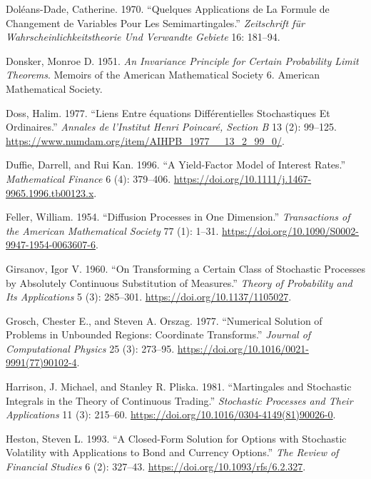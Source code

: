 \documentclass[
  english,
  10pt,
  letterpaper,
  DIV=11,
  numbers=noendperiod]{scrartcl}
\newlength{\cslhangindent}
\newenvironment{CSLReferences}[2] %
 {\begin{list}{}{%
  \setlength{\itemindent}{0pt}
  \setlength{\leftmargin}{0pt}
  \setlength{\parsep}{0pt}
  \ifodd #1
   \setlength{\leftmargin}{\cslhangindent}
   \setlength{\itemindent}{-1\cslhangindent}
  \fi
  \setlength{\itemsep}{#2\baselineskip}}}
 {\end{list}}
\theoremstyle{definition}
\theoremstyle{plain}
\theoremstyle{plain}
\theoremstyle{remark}
\begin{document}
\begin{CSLReferences}{1}{1}
Doléans-Dade, Catherine. 1970. {``Quelques Applications de La Formule de
Changement de Variables Pour Les Semimartingales.''} \emph{Zeitschrift
f{ü}r Wahrscheinlichkeitstheorie Und Verwandte Gebiete} 16: 181--94.

Donsker, Monroe D. 1951. \emph{An Invariance Principle for Certain
Probability Limit Theorems}. Memoirs of the American Mathematical
Society 6. American Mathematical Society.

Doss, Halim. 1977. {``Liens Entre {é}quations Diff{é}rentielles
Stochastiques Et Ordinaires.''} \emph{Annales de l'Institut Henri
Poincar{é}, Section B} 13 (2): 99--125.
\url{https://www.numdam.org/item/AIHPB_1977__13_2_99_0/}.

Duffie, Darrell, and Rui Kan. 1996. {``A Yield-Factor Model of Interest
Rates.''} \emph{Mathematical Finance} 6 (4): 379--406.
\url{https://doi.org/10.1111/j.1467-9965.1996.tb00123.x}.

Feller, William. 1954. {``Diffusion Processes in One Dimension.''}
\emph{Transactions of the American Mathematical Society} 77 (1): 1--31.
\url{https://doi.org/10.1090/S0002-9947-1954-0063607-6}.

Girsanov, Igor V. 1960. {``On Transforming a Certain Class of Stochastic
Processes by Absolutely Continuous Substitution of Measures.''}
\emph{Theory of Probability and Its Applications} 5 (3): 285--301.
\url{https://doi.org/10.1137/1105027}.

Grosch, Chester E., and Steven A. Orszag. 1977. {``Numerical Solution of
Problems in Unbounded Regions: Coordinate Transforms.''} \emph{Journal
of Computational Physics} 25 (3): 273--95.
\url{https://doi.org/10.1016/0021-9991(77)90102-4}.

Harrison, J. Michael, and Stanley R. Pliska. 1981. {``Martingales and
Stochastic Integrals in the Theory of Continuous Trading.''}
\emph{Stochastic Processes and Their Applications} 11 (3): 215--60.
\url{https://doi.org/10.1016/0304-4149(81)90026-0}.

Heston, Steven L. 1993. {``A Closed-Form Solution for Options with
Stochastic Volatility with Applications to Bond and Currency Options.''}
\emph{The Review of Financial Studies} 6 (2): 327--43.
\url{https://doi.org/10.1093/rfs/6.2.327}.


\end{CSLReferences}
\end{document}
